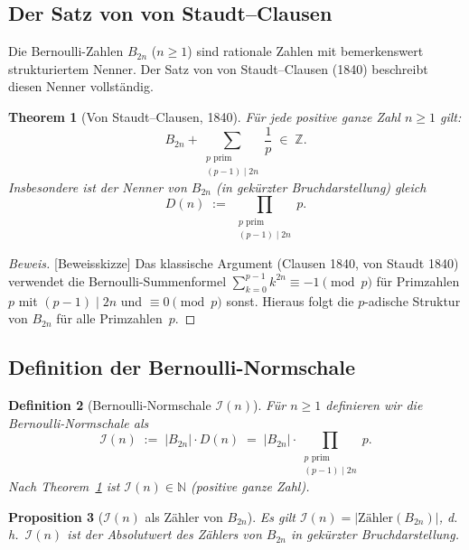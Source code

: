 \documentclass[12pt,a4paper]{article}
\newtheorem{definition}{Definition}[section]
\newtheorem{proposition}[definition]{Proposition}
\newtheorem{theorem}[definition]{Theorem}
\newenvironment{beweis}{\begin{proof}[Beweis]}{\end{proof}}
\newcommand{\N}{\mathbb{N}}
\newcommand{\Z}{\mathbb{Z}}
\newcommand{\abs}[1]{\lvert#1\rvert}
\newcommand{\In}{\mathcal{I}}      %
\newcommand{\Denom}[1]{D(#1)}     %
\begin{document}
\subsection{Der Satz von von Staudt--Clausen}

Die Bernoulli-Zahlen $B_{2n}$ ($n \geq 1$) sind rationale Zahlen mit
bemerkenswert strukturiertem Nenner. Der Satz von von Staudt--Clausen
(1840) beschreibt diesen Nenner vollständig.

\begin{theorem}[Von Staudt--Clausen, 1840]
\label{thm:staudt-clausen}
Für jede positive ganze Zahl $n \geq 1$ gilt:
\[
  B_{2n} + \sum_{\substack{p \text{ prim}\\(p-1)\mid 2n}} \frac{1}{p}
  \;\in\; \Z.
\]
Insbesondere ist der Nenner von $B_{2n}$ (in gekürzter Bruchdarstellung) gleich
\[
  \Denom{n} \;:=\; \prod_{\substack{p \text{ prim}\\(p-1)\mid 2n}} p.
\]
\end{theorem}

\begin{beweis}[Beweisskizze]
Das klassische Argument (Clausen 1840, von Staudt 1840) verwendet die
Bernoulli-Summenformel $\sum_{k=0}^{p-1} k^{2n} \equiv -1 \pmod{p}$
für Primzahlen $p$ mit $(p-1)\mid 2n$ und $\equiv 0 \pmod{p}$ sonst.
Hieraus folgt die $p$-adische Struktur von $B_{2n}$ für alle Primzahlen~$p$.
\end{beweis}

\subsection{Definition der Bernoulli-Normschale}

\begin{definition}[Bernoulli-Normschale $\In(n)$]
\label{def:bernoulli-normschale}
Für $n \geq 1$ definieren wir die \emph{Bernoulli-Normschale} als
\[
  \In(n) \;:=\; \abs{B_{2n}} \cdot \Denom{n}
         \;=\; \abs{B_{2n}} \cdot \prod_{\substack{p \text{ prim}\\(p-1)\mid 2n}} p.
\]
Nach Theorem~\ref{thm:staudt-clausen} ist $\In(n) \in \N$ (positive ganze Zahl).
\end{definition}

\begin{proposition}[$\In(n)$ als Zähler von $B_{2n}$]
\label{prop:zaehler}
Es gilt $\In(n) = \abs{\text{Zähler}(B_{2n})}$, d.\,h.\ $\In(n)$ ist der
Absolutwert des Zählers von $B_{2n}$ in gekürzter Bruchdarstellung.
\end{proposition}
\end{document}
